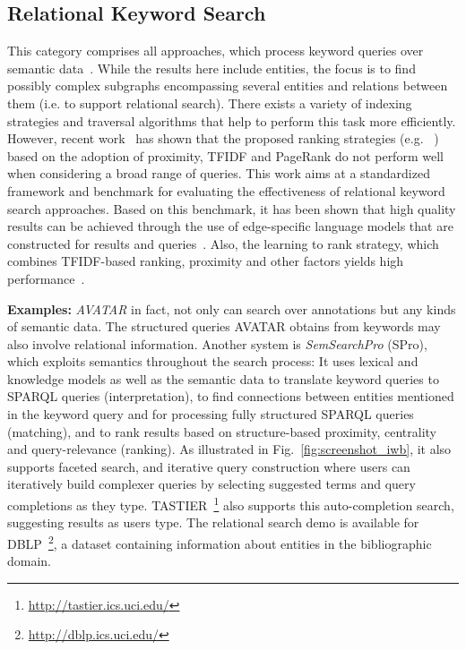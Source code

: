 \subsection{Relational Keyword Search}
This category comprises all approaches, which process keyword queries over semantic data~\cite{DBLP:conf/icde/TranWRC09,DBLP:conf/cikm/LadwigT11,DBLP:conf/sigmod/LiOFWZ08}. While the results here include entities, the focus is to find possibly complex subgraphs encompassing several entities and relations between them (i.e. to support relational search). There exists a variety of indexing strategies and traversal algorithms that help to perform this task more efficiently. However, recent work~\cite{DBLP:conf/cikm/CoffmanW10} has shown that the proposed ranking strategies (e.g. ~\cite{DBLP:conf/icde/TranWRC09,DBLP:conf/sigmod/LiuYMC06}) based on the adoption of proximity, TFIDF and PageRank do not perform well when considering a broad range of queries. This work aims at a standardized framework and benchmark for evaluating the effectiveness of relational keyword search approaches. Based on this benchmark, it has been shown that high quality results can be achieved through the use of edge-specific language models that are constructed for results and queries~\cite{DBLP:conf/cikm/BicerTN11}. Also, the learning to rank strategy, which combines TFIDF-based ranking, proximity and other factors yields high performance~\cite{DBLP:conf/cikm/CoffmanW11}. 

\textbf{Examples:} \emph{AVATAR} in fact, not only can search over annotations but any kinds of semantic data. The structured queries AVATAR obtains from keywords may also involve relational information. Another system is \emph{SemSearchPro} (SPro), which exploits semantics throughout the search process: It uses lexical and knowledge models as well as the semantic data to translate keyword queries to SPARQL queries (interpretation), to find connections between entities mentioned in the keyword query and for processing fully structured SPARQL queries (matching), and to rank results based on structure-based proximity, centrality and query-relevance (ranking). As illustrated in Fig.~\ref{fig:screenshot_iwb}, it also supports faceted search, and iterative query construction where users can iteratively build complexer queries by selecting suggested terms and query completions as they type. TASTIER~\footnote{\url{http://tastier.ics.uci.edu/}} also supports this auto-completion search, suggesting results as users type. The relational search demo is available for DBLP~\footnote{\url{http://dblp.ics.uci.edu/}}, a dataset containing information about entities in the bibliographic domain. 

